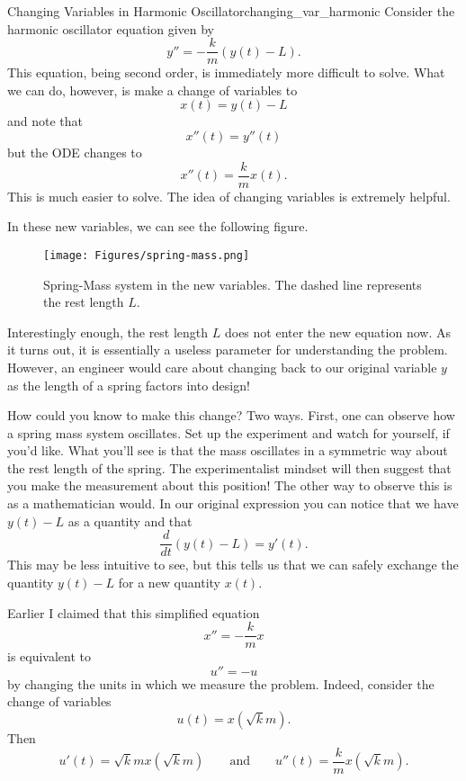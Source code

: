         \begin{ex}{Changing Variables in Harmonic Oscillator}{changing_var_harmonic}
        Consider the harmonic oscillator equation given by
        \[
        y'' = -\frac{k}{m}(y(t)-L).
        \]
        This equation, being second order, is immediately more difficult to solve.  What we can do, however, is make a change of variables to
        \[
        x(t)=y(t)-L
        \]
        and note that
        \[
        x''(t)=y''(t)
        \]
        but the ODE changes to
        \[
        x''(t)=\frac{k}{m}x(t).
        \]
        This is much easier to solve.  The idea of changing variables is extremely helpful.

        In these new variables, we can see the following figure.
        \begin{figure}[H]
            \centering
            \texttt{[image: Figures/spring-mass.png]}
            \caption{Spring-Mass system in the new variables. The dashed line represents the rest length $L$.}
            \label{fig:spring_mass}
        \end{figure}
        Interestingly enough, the rest length $L$ does not enter the new equation now. As it turns out, it is essentially a useless parameter for understanding the problem.  However, an engineer would care about changing back to our original variable $y$ as the length of a spring factors into design!

        How could you know to make this change? Two ways.  First, one can observe how a spring mass system oscillates.  Set up the experiment and watch for yourself, if you'd like.  What you'll see is that the mass oscillates in a symmetric way about the rest length of the spring. The experimentalist mindset will then suggest that you make the measurement about this position! The other way to observe this is as a mathematician would.  In our original expression you can notice that we have $y(t)-L$ as a quantity and that
        \[
        \frac{d}{dt} (y(t)-L) = y'(t).
        \]
        This may be less intuitive to see, but this tells us that we can safely exchange the quantity $y(t)-L$ for a new quantity $x(t).$
        \end{ex}

        Earlier I claimed that this simplified equation
        \[
        x'' = -\frac{k}{m}x
        \]
        is equivalent to
        \[
        u''=-u
        \]
        by changing the units in which we measure the problem.  Indeed, consider the change of variables
        \[
        u(t)=x\left( \sqrt{k}{m}\right).
        \]
        Then
        \[
        u'(t)=\sqrt{k}{m}x\left(\sqrt{k}{m}\right) \qquad \textrm{and} \qquad u''(t)=\frac{k}{m}x\left( \sqrt{k}{m}\right).
        \]

